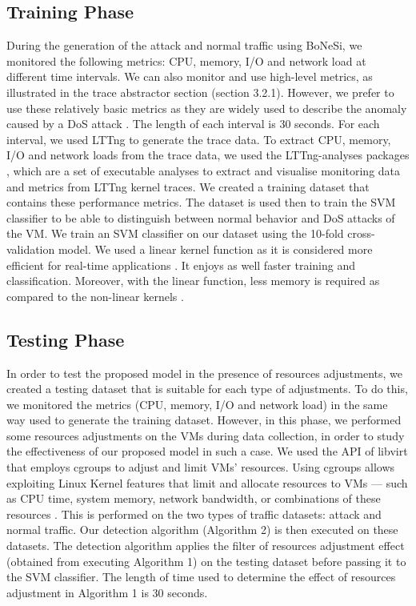 \documentclass[twocolumn]{bmcart}%
\begin{document}
\subsection*{Training Phase}

During the generation of the attack and normal traffic using BoNeSi, we monitored the following metrics: CPU, memory, I/O and network load at different time intervals. We can also monitor and use high-level metrics, as illustrated in the trace abstractor section (section 3.2.1). However, we prefer to use these relatively basic metrics as they are widely used to describe the anomaly caused by a DoS attack \cite{modi2013survey}. The length of each interval is 30 seconds. For each interval, we used LTTng to generate the trace data. To extract CPU, memory, I/O and network loads from the trace data, we used the LTTng-analyses packages \cite{lttng:2016}, which are a set of executable analyses to extract and visualise monitoring data and metrics from LTTng kernel traces. We created a training dataset that contains these performance metrics. The dataset is used then to train the SVM classifier to be able to distinguish between normal behavior and DoS attacks of the VM. We train an SVM classifier on our dataset using the 10-fold cross-validation model. We used a linear kernel function as it is considered more efficient for real-time applications \cite{maji2013efficient}. It enjoys as well faster training and classification. Moreover, with the linear function, less memory is required as compared to the non-linear kernels \cite{maji2013efficient}.


\subsection*{Testing Phase}

In order to test the proposed model in the presence of resources adjustments, we created a testing dataset that is suitable for each type of adjustments. To do this, we monitored the metrics (CPU, memory, I/O and network load) in the same way used to generate the training dataset. However, in this phase, we performed some resources adjustments on the VMs during data collection, in order to study the effectiveness of our proposed model in such a case. We used the API of libvirt that employs cgroups \cite{libvirt:2016} to adjust and limit VMs' resources. Using cgroups allows exploiting Linux Kernel features that limit and allocate resources to VMs — such as CPU time, system memory, network bandwidth, or combinations of these resources \cite{cgroups:2016}. This is performed on the two types of traffic datasets: attack and normal traffic. Our detection algorithm (Algorithm 2) is then executed on these datasets. The detection algorithm applies the filter of resources adjustment effect (obtained from executing Algorithm 1) on the testing dataset before passing it to the SVM classifier. The length of time used to determine the effect of resources adjustment in Algorithm 1 is 30 seconds.
\end{document}
